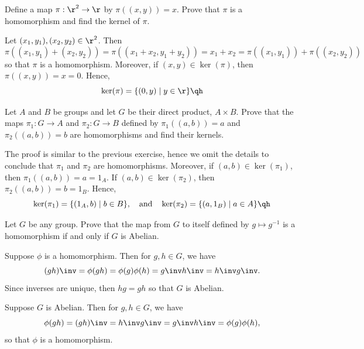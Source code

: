 \begin{exercise}\label{ex1.6.15}
    Define a map $\pi : \r^2 \to \r$ by $\pi((x,y)) = x$. Prove that $\pi$ is a homomorphism and find the kernel of $\pi$.
\end{exercise}

\begin{sol}
    Let $(x_1, y_1), (x_2, y_2) \in \r^2$. Then
    \[\pi((x_1, y_1) + (x_2, y_2)) = \pi((x_1 + x_2, y_1 + y_2)) = x_1 + x_2 = \pi((x_1, y_1)) + \pi((x_2, y_2))\]
    so that $\pi$ is a homomorphism. Moreover, if $(x, y) \in \ker(\pi)$, then $\pi((x, y)) = x = 0$. Hence,
    \[\ker(\pi) = \{(0, y) \mid y \in \r\} \qh\]
\end{sol}

\begin{exercise}\label{ex1.6.16}
    Let $A$ and $B$ be groups and let $G$ be their direct product, $A \times B$. Prove that the maps $\pi_1 : G \to A$ and $\pi_2 : G \to B$ defined by $\pi_1((a,b)) = a$ and $\pi_2((a,b)) = b$ are homomorphisms and find their kernels.
\end{exercise}

\begin{sol}
    The proof is similar to the previous exercise, hence we omit the details to conclude that $\pi_1$ and $\pi_2$ are homomorphisms. Moreover, if $(a, b) \in \ker(\pi_1)$, then $\pi_1((a, b)) = a = 1_A$. If $(a, b) \in \ker(\pi_2)$, then $\pi_2((a, b)) = b = 1_B$. Hence,
    \[\ker(\pi_1) = \{(1_A, b) \mid b \in B\}, \quad \text{and} \quad \ker(\pi_2) = \{(a, 1_B) \mid a \in A\} \qh\]
\end{sol}

\begin{exercise} \label{ex1.6.17}
    Let $G$ be any group. Prove that the map from $G$ to itself defined by $g \mapsto g^{-1}$ is a homomorphism if and only if $G$ is Abelian.
\end{exercise}

\begin{solitem}
    \item [\rightimp] Suppose $\phi$ is a homomorphism. Then for $g, h \in G$, we have
    \[(gh)\inv = \phi(gh) = \phi(g)\phi(h) = g\inv h\inv = h\inv g\inv.\]
    Since inverses are unique, then $hg = gh$ so that $G$ is Abelian.
    \item [\leftimp] Suppose $G$ is Abelian. Then for $g, h \in G$, we have
    \[\phi(gh) = (gh)\inv = h\inv g\inv = g\inv h\inv = \phi(g)\phi(h),\]
    so that $\phi$ is a homomorphism.
\end{solitem}

